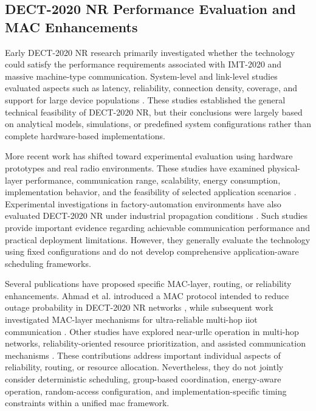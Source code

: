 \documentclass[12pt,a4paper]{article}
\begin{document}

\subsection{DECT-2020 NR Performance Evaluation and MAC Enhancements}
\label{subsec:performance_mac_enhancements}

Early DECT-2020 NR research primarily investigated whether the technology could satisfy the performance requirements associated with IMT-2020 and massive machine-type communication. System-level and link-level studies evaluated aspects such as latency, reliability, connection density, coverage, and support for large device populations
\cite{dhanwaniAssessmentCandidateTechnology2020,
anttonenEnablingMassiveMachine2021a,
pennerURLLCPerformanceEvaluation2021,
smidaETSIDECT2020Component2023}.
These studies established the general technical feasibility of DECT-2020 NR, but their conclusions were largely based on analytical models, simulations, or predefined system configurations rather than complete hardware-based implementations.

More recent work has shifted toward experimental evaluation using hardware prototypes and real radio environments. These studies have examined physical-layer performance, communication range, scalability, energy consumption, implementation behavior, and the feasibility of selected application scenarios
\cite{wassmannPerformanceDECT2020NR2024,
haqueDECT2020NRLink2025,
bandaraExperimentalValidationAnalysis2025,
grafWhatExpectWhen2026}.
Experimental investigations in factory-automation environments have also evaluated DECT-2020 NR under industrial propagation conditions
\cite{llagunoPhysicalLayerPerformance2024}.
Such studies provide important evidence regarding achievable communication performance and practical deployment limitations. However, they generally evaluate the technology using fixed configurations and do not develop comprehensive application-aware scheduling frameworks.

Several publications have proposed specific MAC-layer, routing, or reliability enhancements. Ahmad et al. introduced a MAC protocol intended to reduce outage probability in DECT-2020 NR networks
\cite{ahmadMACProtocolReducing2024},
while subsequent work investigated MAC-layer mechanisms for ultra-reliable multi-hop \gls{iiot} communication
\cite{ahmadMACLayerProtocolUltraReliable2025}.
Other studies have explored near-\gls{urllc} operation in multi-hop networks, reliability-oriented resource prioritization, and assisted communication mechanisms
\cite{glazkovImprovingNearURLLCServices2025,
binasifIRSAssistedDECT2020NR2025}.
These contributions address important individual aspects of reliability, routing, or resource allocation. Nevertheless, they do not jointly consider deterministic scheduling, group-based coordination, energy-aware operation, random-access configuration, and implementation-specific timing constraints within a unified \gls{mac} framework.
\end{document}
